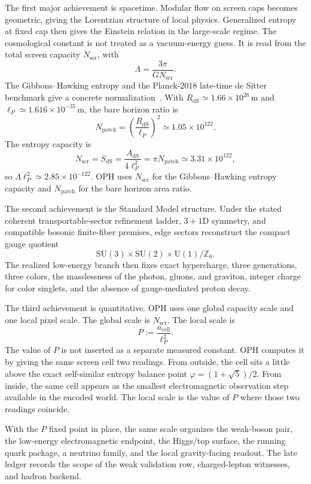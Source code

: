 \documentclass[11pt]{article}
\newcommand{\SU}{\mathrm{SU}}
\newcommand{\U}{\mathrm{U}}
\begin{document}
The first major achievement is spacetime. Modular flow on screen caps becomes geometric, giving the
Lorentzian structure of local physics. Generalized entropy at fixed cap then gives the Einstein
relation in the large-scale regime. The cosmological constant is not treated as a vacuum-energy
guess. It is read from the total screen capacity \(N_{\mathrm{scr}}\), with
\[
\Lambda=\frac{3\pi}{G N_{\mathrm{scr}}}.
\]
The Gibbons--Hawking entropy and the Planck-2018 late-time de Sitter benchmark give a concrete normalization~\cite{gibbonsHawking77,planck18}. With
\(R_{\mathrm{dS}}\simeq1.66\times10^{26}\,\mathrm m\) and
\(\ell_P\simeq1.616\times10^{-35}\,\mathrm m\), the bare horizon ratio is
\[
N_{\mathrm{patch}}=\left(\frac{R_{\mathrm{dS}}}{\ell_P}\right)^2\simeq1.05\times10^{122}.
\]
The entropy capacity is
\[
N_{\mathrm{scr}}=S_{\mathrm{dS}}=\frac{A_{\mathrm{dS}}}{4\ell_P^2}
=\pi N_{\mathrm{patch}}\simeq3.31\times10^{122},
\]
so \(\Lambda\ell_P^2\simeq2.85\times10^{-122}\). OPH uses \(N_{\mathrm{scr}}\) for the
Gibbons--Hawking entropy capacity and \(N_{\mathrm{patch}}\) for the bare horizon area ratio.

The second achievement is the Standard Model structure. Under the stated
coherent transportable-sector refinement ladder, \(3+1\)D symmetry, and compatible bosonic finite-fiber premises, edge sectors reconstruct the
compact gauge quotient
\[
\SU(3)\times\SU(2)\times\U(1)/\mathbb Z_6.
\]
The realized low-energy branch then fixes exact hypercharge, three generations, three colors, the
masslessness of the photon, gluons, and graviton, integer charge for color singlets, and the absence
of gauge-mediated proton decay.

The third achievement is quantitative. OPH uses one global capacity scale and one local pixel scale.
The global scale is \(N_{\mathrm{scr}}\). The local scale is
\[
P:=\frac{a_{\mathrm{cell}}}{\ell_P^2}.
\]
The value of \(P\) is not inserted as a separate measured constant. OPH computes it by giving the
same screen cell two readings. From outside, the cell sits a little above the exact self-similar
entropy balance point \(\varphi=(1+\sqrt5)/2\). From inside, the same cell appears as the smallest
electromagnetic observation step available in the encoded world. The local scale is the value of
\(P\) where those two readings coincide.

With the \(P\) fixed point in place, the same scale organizes the weak-boson pair,
the low-energy electromagnetic endpoint, the Higgs/top surface, the running quark package,
a neutrino family, and the local gravity-facing readout. The late ledger records the scope of the
weak validation row, charged-lepton witnesses, and hadron backend.
\end{document}

